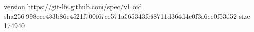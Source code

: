 version https://git-lfs.github.com/spec/v1
oid sha256:998cce483b86e4521f700f67ce571a565343fe68711d364d4c0f3a6ee0f53d52
size 174940

